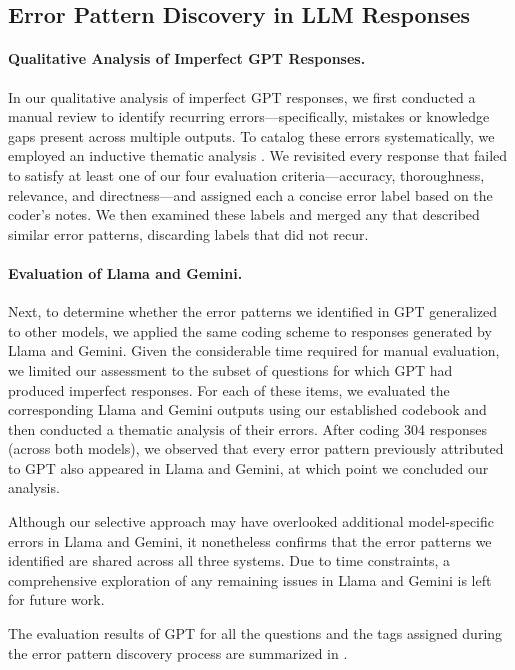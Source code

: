 \subsection{Error Pattern Discovery in LLM Responses} \label{overall-evaluation}






\paragraph{Qualitative Analysis of Imperfect GPT Responses.} In our qualitative analysis of imperfect GPT responses, we first conducted a manual review to identify recurring errors—specifically, mistakes or knowledge gaps present across multiple outputs. To catalog these errors systematically, we employed an inductive thematic analysis \cite{braun-2006-thematic-analysis}. We revisited every response that failed to satisfy at least one of our four evaluation criteria—accuracy, thoroughness, relevance, and directness—and assigned each a concise error label based on the coder’s notes. We then examined these labels and merged any that described similar error patterns, discarding labels that did not recur.

\paragraph{Evaluation of Llama and Gemini.} Next, to determine whether the error patterns we identified in GPT generalized to other models, we applied the same coding scheme to responses generated by Llama and Gemini. Given the considerable time required for manual evaluation, we limited our assessment to the subset of \geminiQuestionsEvaluated questions for which GPT had produced imperfect responses. For each of these items, we evaluated the corresponding Llama and Gemini outputs using our established codebook \cite{codebook} and then conducted a thematic analysis of their errors. After coding 304 responses (across both models), we observed that every error pattern previously attributed to GPT also appeared in Llama and Gemini, at which point we concluded our analysis.

Although our selective approach may have overlooked additional model-specific errors in Llama and Gemini, it nonetheless confirms that the error patterns we identified are shared across all three systems. Due to time constraints, a comprehensive exploration of any remaining issues in Llama and Gemini is left for future work.










The evaluation results of GPT for all the questions and the tags assigned during the error pattern discovery process are summarized in .%



